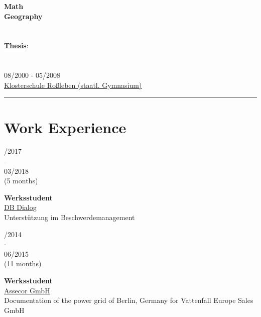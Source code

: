 \documentclass{article}
\begin{document}
\begin{minipage}[t]{0.69\textwidth}
\begin{minipage}{0.27\textwidth}
	\textbf{Math}\\
	\textbf{Geography}\\\\\\
	\textbf{\underline{Thesis}}:\\
	 \\\\
	 08/2000 - 05/2008\\
	 \href{https://www.klosterschule.de/}{\color{pblue}Klosterschule Roßleben (staatl. Gymnasium)}
\\
		\end{minipage}
		\hrule
		\section*{\fontsize{18pt}{24pt}\selectfont \color{pblue} Work Experience}
		\begin{minipage}{0.49\textwidth}
		\begin{minipage}[t]{0.25\textwidth}
		/2017\\ -\\ 03/2018\\(5 months)
		\end{minipage}
		\hfill
		\begin{minipage}[t]{0.75\textwidth}
		\textbf{Werksstudent}\\ \href{https://assecor.de/}{\color{pblue}DB Dialog}\\
	    Unterstützung im Beschwerdemanagement
		\end{minipage}
		
		\vspace{0.5cm}
		
		\begin{minipage}[t]{0.25\textwidth}
		/2014\\ -\\ 06/2015\\(11 months)
		\end{minipage}
		\hfill
		\begin{minipage}[t]{0.75\textwidth}
		\textbf{Werksstudent}\\
		\href{https://assecor.de/}{\color{pblue}Assecor GmbH}\\
	     Documentation of the power grid of Berlin, Germany for Vattenfall Europe Sales GmbH
		\end{minipage}
		

\end{minipage}
\end{minipage}
\end{document}
